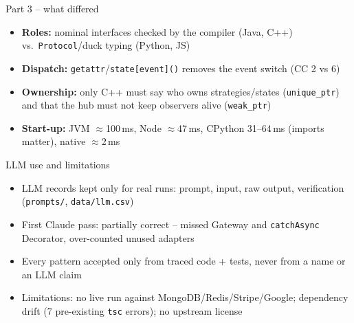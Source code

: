 \documentclass[aspectratio=169,10pt]{beamer}
\begin{document}
\begin{frame}{Part 3 -- what differed}
\begin{itemize}
\item \textbf{Roles:} nominal interfaces checked by the compiler (Java, C++) vs.\ \texttt{Protocol}/duck typing (Python, JS)
\item \textbf{Dispatch:} \texttt{getattr}/\texttt{state[event]()} removes the event switch (CC 2 vs 6)
\item \textbf{Ownership:} only C++ must say who owns strategies/states (\texttt{unique\_ptr}) and that the hub must not keep observers alive (\texttt{weak\_ptr})
\item \textbf{Start-up:} JVM $\approx$100\,ms, Node $\approx$47\,ms, CPython 31--64\,ms (imports matter), native $\approx$2\,ms
\end{itemize}
\end{frame}

\begin{frame}{LLM use and limitations}
\begin{itemize}
\item LLM records kept only for real runs: prompt, input, raw output, verification (\texttt{prompts/}, \texttt{data/llm.csv})
\item First Claude pass: partially correct -- missed Gateway and \texttt{catchAsync} Decorator, over-counted unused adapters
\item Every pattern accepted only from traced code + tests, never from a name or an LLM claim
\item Limitations: no live run against MongoDB/Redis/Stripe/Google; dependency drift (7 pre-existing \texttt{tsc} errors); no upstream license
\end{itemize}
\end{frame}
\end{document}
